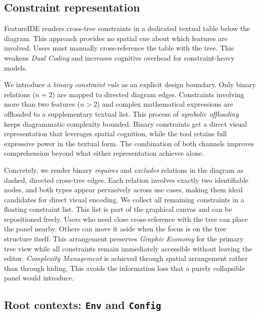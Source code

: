 \subsection{Constraint representation}
\label{subsec:vis_constraints}
 
FeatureIDE renders cross-tree constraints in a dedicated textual table below the diagram.
This approach provides no spatial cue about which features are involved.
Users must manually cross-reference the table with the tree.
This weakens \textit{Dual Coding} and increases cognitive overhead for constraint-heavy models.
 
We introduce a \emph{binary constraint rule} as an explicit design boundary.
Only binary relations ($n = 2$) are mapped to directed diagram edges.
Constraints involving more than two features ($n > 2$) and complex mathematical expressions are offloaded to a supplementary textual list.
This process of \emph{symbolic offloading} keeps diagrammatic complexity bounded.
Binary constraints get a direct visual representation that leverages spatial cognition, while the tool retains full expressive power in the textual form.
The combination of both channels improves comprehension beyond what either representation achieves alone.

Concretely, we render binary \textit{requires} and \textit{excludes} relations in the diagram as dashed, directed cross-tree edges.
Each relation involves exactly two identifiable nodes, and both types appear pervasively across use cases, making them ideal candidates for direct visual encoding.
We collect all remaining constraints in a floating constraint list.
This list is part of the graphical canvas and can be repositioned freely.
Users who need close cross-reference with the tree can place the panel nearby.
Others can move it aside when the focus is on the tree structure itself.
This arrangement preserves \textit{Graphic Economy} for the primary tree view while all constraints remain immediately accessible without leaving the editor.
\textit{Complexity Management} is achieved through spatial arrangement rather than through hiding.
This avoids the information loss that a purely collapsible panel would introduce.

\subsection{Root contexts: \texttt{Env} and \texttt{Config}}
\label{subsec:vis_env-config}
 
